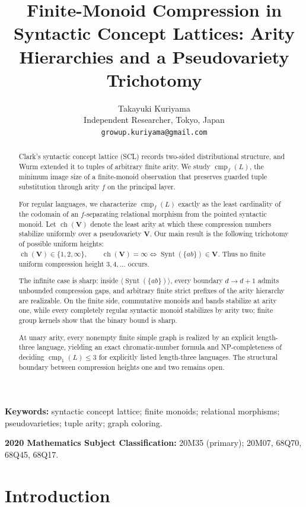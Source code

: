 \documentclass[10pt,a4paper]{article}
\title{Finite-Monoid Compression in Syntactic Concept Lattices: Arity Hierarchies and a Pseudovariety Trichotomy}
\author{Takayuki Kuriyama\\
Independent Researcher, Tokyo, Japan\\
\texttt{growup.kuriyama@gmail.com}}
\date{}
\theoremstyle{definition}
\theoremstyle{remark}
\newcommand{\cmp}{\operatorname{cmp}}
\begin{document}
\maketitle


\begin{abstract}
Clark's syntactic concept lattice (SCL) records two-sided distributional
structure, and Wurm extended it to tuples of arbitrary finite arity.
We study \(\cmp_f(L)\), the minimum image size of a finite-monoid observation
that preserves guarded tuple substitution through arity \(f\) on the
principal layer.

For regular languages, we characterize \(\cmp_f(L)\) exactly as the least
cardinality of the codomain of an \(f\)-separating relational morphism from
the pointed syntactic monoid.  Let \(\operatorname{ch}(\mathbf V)\) denote
the least arity at which these compression numbers stabilize uniformly over
a pseudovariety \(\mathbf V\).  Our main result is the following trichotomy
of possible uniform heights:
\(\operatorname{ch}(\mathbf V)\in\{1,2,\infty\}, \qquad \operatorname{ch}(\mathbf V)=\infty \Longleftrightarrow \operatorname{Synt}(\{ab\})\in\mathbf V.\)
Thus no finite uniform compression height \(3,4,\ldots\) occurs.

The infinite case is sharp: inside
\(\langle\operatorname{Synt}(\{ab\})\rangle\), every boundary
\(d\to d+1\) admits unbounded compression gaps, and arbitrary finite strict
prefixes of the arity hierarchy are realizable.  On the finite side,
commutative monoids and bands stabilize at arity one, while every completely
regular syntactic monoid stabilizes by arity two; finite group kernels show
that the binary bound is sharp.

At unary arity, every nonempty finite simple graph is realized by an explicit
length-three language, yielding an exact chromatic-number formula and
NP-completeness of deciding \(\cmp_1(L)\le3\) for explicitly listed
length-three languages.  The structural boundary between compression heights
one and two remains open.
\end{abstract}

\noindent\textbf{Keywords:} syntactic concept lattice; finite monoids; relational morphisms; pseudovarieties; tuple arity; graph coloring.

\noindent\textbf{2020 Mathematics Subject Classification:}
20M35 (primary); 20M07, 68Q70, 68Q45, 68Q17.

\section{Introduction}
\end{document}
